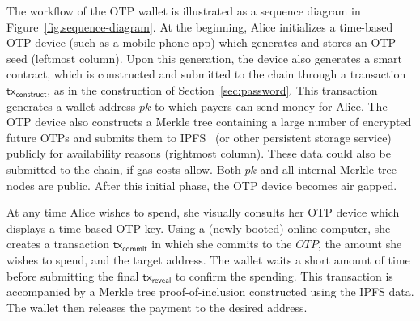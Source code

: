 The workflow of the OTP wallet is illustrated as a sequence diagram
in Figure~\ref{fig.sequence-diagram}. At the beginning, Alice initializes
a time-based OTP device (such as a mobile phone app) which
generates and stores an OTP seed (leftmost column). Upon this generation, the device also
generates a smart contract, which is constructed and submitted to the chain
through a transaction $\textsf{tx}_\textsf{construct}$, as in the construction of
Section~\ref{sec:password}. This transaction generates a wallet address $pk$ to which
payers can send money for Alice. The OTP device also constructs a Merkle tree containing
a large number of encrypted future OTPs and submits them to IPFS~\cite{ipfs} (or other persistent storage service)
publicly for availability reasons (rightmost column). These data could also be submitted to the chain, if
gas costs allow. Both $pk$ and all internal Merkle tree nodes are public. After this
initial phase, the OTP device becomes air gapped.

At any time Alice wishes to spend, she visually consults her OTP device which displays a time-based
OTP key. Using a (newly booted) online computer, she creates a transaction $\textsf{tx}_\textsf{commit}$ in
which she commits to the $OTP$, the amount she wishes to spend, and the target address.
The wallet waits a short amount of time before submitting the final $\textsf{tx}_\textsf{reveal}$
to confirm the spending. This transaction is accompanied by a Merkle tree proof-of-inclusion
constructed using the IPFS data. The wallet then releases the payment to the desired address.

